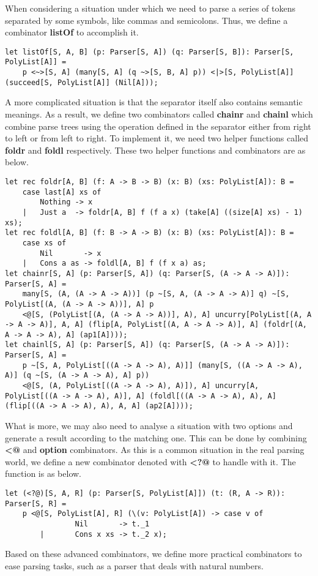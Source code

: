When considering a situation under which we need to parse a series of tokens separated by some symbols, like commas and semicolons. Thus, we define a combinator \textbf{listOf} to accomplish it.
\begin{lstlisting}
let listOf[S, A, B] (p: Parser[S, A]) (q: Parser[S, B]): Parser[S, PolyList[A]] =
	p <~>[S, A] (many[S, A] (q ~>[S, B, A] p)) <|>[S, PolyList[A]] (succeed[S, PolyList[A]] (Nil[A]));
\end{lstlisting}
A more complicated situation is that the separator itself also contains semantic meanings. As a result, we define two combinators called \textbf{chainr} and \textbf{chainl} which combine parse trees using the operation defined in the separator either from right to left or from left to right. To implement it, we need two helper functions called \textbf{foldr} and \textbf{foldl} respectively. These two helper functions and combinators are as below.
\begin{lstlisting}
let rec foldr[A, B] (f: A -> B -> B) (x: B) (xs: PolyList[A]): B =
	case last[A] xs of
		Nothing -> x
	|	Just a  -> foldr[A, B] f (f a x) (take[A] ((size[A] xs) - 1) xs);
let rec foldl[A, B] (f: B -> A -> B) (x: B) (xs: PolyList[A]): B =
	case xs of
		Nil 	  -> x
	|	Cons a as -> foldl[A, B] f (f x a) as;
let chainr[S, A] (p: Parser[S, A]) (q: Parser[S, (A -> A -> A)]): Parser[S, A] =
	many[S, (A, (A -> A -> A))] (p ~[S, A, (A -> A -> A)] q) ~[S, PolyList[(A, (A -> A -> A))], A] p
	<@[S, (PolyList[(A, (A -> A -> A))], A), A] uncurry[PolyList[(A, A -> A -> A)], A, A] (flip[A, PolyList[(A, A -> A -> A)], A] (foldr[(A, A -> A -> A), A] (ap1[A])));
let chainl[S, A] (p: Parser[S, A]) (q: Parser[S, (A -> A -> A)]): Parser[S, A] =
	p ~[S, A, PolyList[((A -> A -> A), A)]] (many[S, ((A -> A -> A), A)] (q ~[S, (A -> A -> A), A] p))
	<@[S, (A, PolyList[((A -> A -> A), A)]), A] uncurry[A, PolyList[((A -> A -> A), A)], A] (foldl[((A -> A -> A), A), A] (flip[((A -> A -> A), A), A, A] (ap2[A])));
\end{lstlisting}
What is more, we may also need to analyse a situation with two options and generate a result according to the matching one. This can be done by combining \textbf{<@} and \textbf{option} combinators. As this is a common situation in the real parsing world, we define a new combinator denoted with \textbf{<?@} to handle with it. The function is as below.
\begin{lstlisting}
let (<?@)[S, A, R] (p: Parser[S, PolyList[A]]) (t: (R, A -> R)): Parser[S, R] =
	p <@[S, PolyList[A], R] (\(v: PolyList[A]) -> case v of
			    Nil 	  -> t._1
		|		Cons x xs -> t._2 x);
\end{lstlisting}
Based on these advanced combinators, we define more practical combinators to ease parsing tasks, such as a parser that deals with natural numbers.

